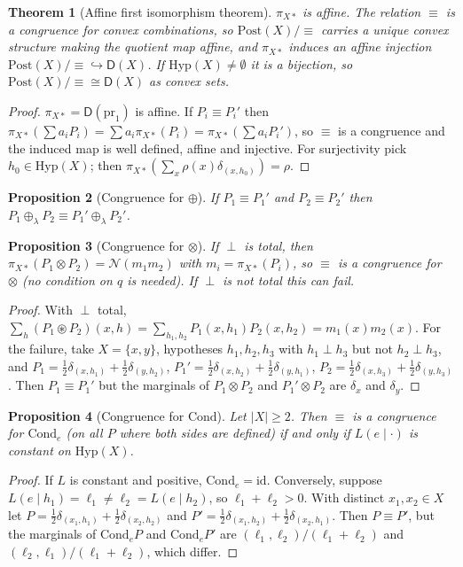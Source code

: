 \documentclass[11pt]{article}
\newtheorem{theorem}{Theorem}[section]
\newtheorem{proposition}[theorem]{Proposition}
\theoremstyle{definition}
\theoremstyle{remark}
\newcommand{\D}{\mathsf{D}}
\newcommand{\Hyp}{\mathrm{Hyp}}
\newcommand{\Post}{\mathrm{Post}}
\newcommand{\Cond}{\mathrm{Cond}}
\newcommand{\id}{\mathrm{id}}
\newcommand{\N}{\mathcal{N}}
\newcommand{\cp}{\circledast}
\begin{document}
\begin{theorem}[Affine first isomorphism theorem]\label{thm:firstiso}
$\pi_{X*}$ is affine. The relation $\equiv$ is a congruence for convex combinations, so
$\Post(X)/{\equiv}$ carries a unique convex structure making the quotient map affine, and
$\pi_{X*}$ induces an affine injection $\Post(X)/{\equiv}\hookrightarrow\D(X)$. If
$\Hyp(X)\neq\emptyset$ it is a bijection, so $\Post(X)/{\equiv}\cong\D(X)$ as convex sets.
\end{theorem}
\begin{proof}
$\pi_{X*}=\D(\mathrm{pr}_1)$ is affine. If $P_i\equiv P_i'$ then
$\pi_{X*}(\sum a_iP_i)=\sum a_i\pi_{X*}(P_i)=\pi_{X*}(\sum a_iP_i')$, so $\equiv$ is a congruence and
the induced map is well defined, affine and injective. For surjectivity pick $h_0\in\Hyp(X)$; then
$\pi_{X*}(\sum_x\rho(x)\delta_{(x,h_0)})=\rho$.
\end{proof}

\begin{proposition}[Congruence for $\oplus$]
If $P_1\equiv P_1'$ and $P_2\equiv P_2'$ then $P_1\oplus_\lambda P_2\equiv P_1'\oplus_\lambda P_2'$.
\end{proposition}

\begin{proposition}[Congruence for $\otimes$]\label{prop:cong-tensor}
If $\perp$ is total, then $\pi_{X*}(P_1\otimes P_2)=\N(m_1m_2)$ with $m_i=\pi_{X*}(P_i)$, so $\equiv$
is a congruence for $\otimes$ (no condition on $q$ is needed). If $\perp$ is not total this can fail.
\end{proposition}
\begin{proof}
With $\perp$ total, $\sum_h(P_1\cp P_2)(x,h)=\sum_{h_1,h_2}P_1(x,h_1)P_2(x,h_2)=m_1(x)m_2(x)$.
For the failure, take $X=\{x,y\}$, hypotheses $h_1,h_2,h_3$ with $h_1\perp h_3$ but not
$h_2\perp h_3$, and
$P_1=\tfrac12\delta_{(x,h_1)}+\tfrac12\delta_{(y,h_2)}$,
$P_1'=\tfrac12\delta_{(x,h_2)}+\tfrac12\delta_{(y,h_1)}$,
$P_2=\tfrac12\delta_{(x,h_3)}+\tfrac12\delta_{(y,h_3)}$. Then $P_1\equiv P_1'$ but the marginals of
$P_1\otimes P_2$ and $P_1'\otimes P_2$ are $\delta_x$ and $\delta_y$.
\end{proof}

\begin{proposition}[Congruence for $\Cond$]\label{prop:cong-cond}
Let $|X|\ge2$. Then $\equiv$ is a congruence for $\Cond_e$ (on all $P$ where both sides are defined)
if and only if $L(e\mid\cdot)$ is constant on $\Hyp(X)$.
\end{proposition}
\begin{proof}
If $L$ is constant and positive, $\Cond_e=\id$. Conversely, suppose $L(e\mid h_1)=\ell_1\ne
\ell_2=L(e\mid h_2)$, so $\ell_1+\ell_2>0$. With distinct $x_1,x_2\in X$ let
$P=\tfrac12\delta_{(x_1,h_1)}+\tfrac12\delta_{(x_2,h_2)}$ and
$P'=\tfrac12\delta_{(x_1,h_2)}+\tfrac12\delta_{(x_2,h_1)}$. Then $P\equiv P'$, but the marginals of
$\Cond_eP$ and $\Cond_eP'$ are $(\ell_1,\ell_2)/(\ell_1+\ell_2)$ and $(\ell_2,\ell_1)/(\ell_1+\ell_2)$,
which differ.
\end{proof}
\end{document}
